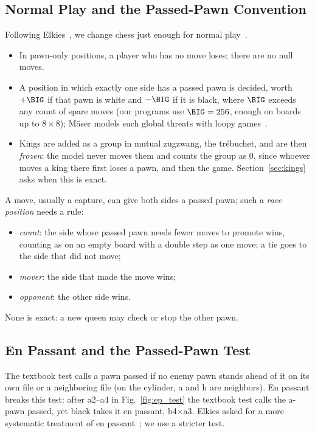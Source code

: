 \subsection{Normal Play and the Passed-Pawn Convention}
Following Elkies~\cite{Elkies1996}, we change chess just enough for normal play~\cite{WinningWays}.
\begin{itemize}
\item In pawn-only positions, a player who has no move loses; there are no null moves.
\item A position in which exactly one side has a passed pawn is decided, worth $+\BIG$ if that pawn is white and
  $-\BIG$ if it is black, where $\BIG$ exceeds any count of spare moves (our programs use $\BIG=256$, enough on boards up to $8\times8$);
  M\"aser models such global threats with loopy games~\cite{Maeser2002}.
\item Kings are added as a group in mutual zugzwang, the tr\'ebuchet, and are then \emph{frozen}: the model
  never moves them and counts the group as $0$, since whoever moves a king there first loses a pawn, and then
  the game. Section~\ref{sec:kings} asks when this is exact.
\end{itemize}
A move, usually a capture, can give both sides a passed pawn; such a \emph{race position} needs a rule:
\begin{itemize}
\item \emph{count}: the side whose passed pawn needs fewer moves to promote wins, counting as on an empty
  board with a double step as one move; a tie goes to the side that did not move;
\item \emph{mover}: the side that made the move wins;
\item \emph{opponent}: the other side wins.
\end{itemize}
None is exact: a new queen may check or stop the other pawn.

\subsection{En Passant and the Passed-Pawn Test}\label{sec:ep}
The textbook test calls a pawn passed if no enemy pawn stands ahead of it on its own file or a neighboring file
(on the cylinder, a and h are neighbors). En passant breaks this test: after a2--a4 in Fig.~\ref{fig:ep_test}
the textbook test calls the a-pawn passed, yet black takes it en passant, b4$\times$a3. Elkies asked for a
more systematic treatment of en passant~\cite{Elkies1996}; we use a stricter test.

